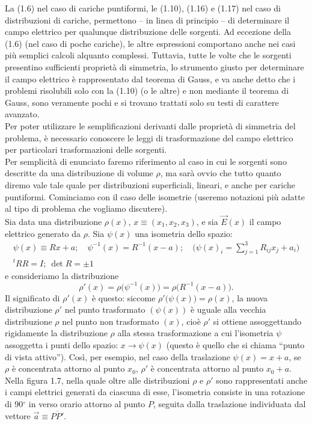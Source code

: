 La (1.6) nel caso di cariche puntiformi, le (1.10), (1.16) e (1.17) nel caso di distribuzioni di cariche, permettono -- in linea di principio -- di determinare il campo elettrico per qualunque distribuzione delle sorgenti. Ad eccezione della (1.6) (nel caso di poche cariche), le altre espressioni comportano anche nei casi più semplici calcoli alquanto complessi. Tuttavia, tutte le volte che le sorgenti presentino sufficienti proprietà di simmetria, lo strumento giusto per determinare il campo elettrico è rappresentato dal teorema di Gauss, e va anche detto che i problemi risolubili solo con la (1.10) (o le altre) e non mediante il teorema di Gauss, sono veramente pochi e si trovano trattati solo su testi di carattere avanzato.\\
Per poter utilizzare le semplificazioni derivanti dalle proprietà di simmetria del problema, è necessario conoscere le leggi di trasformazione del campo elettrico per particolari trasformazioni delle sorgenti.\\
Per semplicità di enunciato faremo riferimento al caso in cui le sorgenti sono descritte da una distribuzione di volume $\rho$, ma sarà ovvio che tutto quanto diremo vale tale quale per distribuzioni superficiali, lineari, e anche per cariche puntiformi. Cominciamo con il caso delle isometrie (useremo notazioni più adatte al tipo di problema che vogliamo discutere).\\
Sia data una distribuzione $\rho(x)$, $x\equiv(x_1,x_2,x_3)$, e sia $\vec E(x)$ il campo elettrico generato da $\rho$. Sia $\psi(x)$ una isometria dello spazio:
\begin{equation}
\begin{gathered}
\psi(x)\equiv Rx+a;\quad\psi^{-1}(x)=R^{-1}(x-a);\quad\Big(\psi(x)_i=\sum_{j=1}^3R_{ij}x_j+a_i\Big)\\
{}^t\!RR=I;\ \det R=\pm1
\end{gathered}
\tag{1.37}
\end{equation}
e consideriamo la distribuzione
\begin{equation}
\rho'(x)=\rho\big(\psi^{-1}(x)\big)=\rho\big(R^{-1}(x-a)\big).
\tag{1.38}
\end{equation}
Il significato di $\rho'(x)$ è questo: siccome $\rho'\big(\psi(x)\big)=\rho(x)$, la nuova distribuzione $\rho'$ nel punto trasformato $(\psi(x))$ è uguale alla vecchia distribuzione $\rho$ nel punto non trasformato $(x)$, cioè $\rho'$ si ottiene assoggettando rigidamente la distribuzione $\rho$ alla stessa trasformazione a cui l'isometria $\psi$ assoggetta i punti dello spazio: $x\to\psi(x)$ (questo è quello che si chiama ``punto di vista attivo''). Così, per esempio, nel caso della traslazione $\psi(x)=x+a$, se $\rho$ è concentrata attorno al punto $x_0$, $\rho'$ è concentrata attorno al punto $x_0+a$. Nella figura 1.7, nella quale oltre alle distribuzioni $\rho$ e $\rho'$ sono rappresentati anche i campi elettrici generati da ciascuna di esse, l'isometria consiste in una rotazione di 90$^\circ$ in verso orario attorno al punto $P$, seguita dalla traslazione individuata dal vettore $\vec a\equiv\overline{PP'}$.
